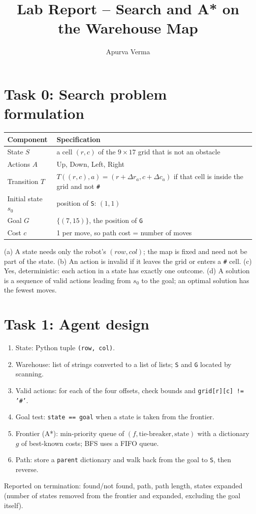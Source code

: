 \documentclass[10pt,a4paper]{article}
\title{Lab Report -- Search and A* on the Warehouse Map}
\author{Apurva Verma}\date{}
\begin{document}
\maketitle

\section*{Task 0: Search problem formulation}
\begin{center}\begin{tabular}{p{2.6cm}p{13cm}}\toprule
Component & Specification\\\midrule
State $S$ & a cell $(r,c)$ of the $9\times17$ grid that is not an obstacle\\
Actions $A$ & Up, Down, Left, Right\\
Transition $T$ & $T((r,c),a)=(r+\Delta r_a,c+\Delta c_a)$ if that cell is inside the grid and not \texttt{\#}\\
Initial state $s_0$ & position of \texttt{S}: $(1,1)$\\
Goal $G$ & $\{(7,15)\}$, the position of \texttt{G}\\
Cost $c$ & 1 per move, so path cost = number of moves\\\bottomrule\end{tabular}\end{center}
(a) A state needs only the robot's $(row,col)$; the map is fixed and need not be part of the state. (b) An action is invalid if it leaves the grid or enters a \texttt{\#} cell. (c) Yes, deterministic: each action in a state has exactly one outcome. (d) A solution is a sequence of valid actions leading from $s_0$ to the goal; an optimal solution has the fewest moves.

\section*{Task 1: Agent design}
\begin{enumerate}[leftmargin=*]
\item State: Python tuple \texttt{(row, col)}. \item Warehouse: list of strings converted to a list of lists; \texttt{S} and \texttt{G} located by scanning. \item Valid actions: for each of the four offsets, check bounds and \texttt{grid[r][c] != '\#'}. \item Goal test: \texttt{state == goal} when a state is taken from the frontier. \item Frontier (A*): min-priority queue of $(f,\text{tie-breaker},\text{state})$ with a dictionary $g$ of best-known costs; BFS uses a FIFO queue. \item Path: store a \texttt{parent} dictionary and walk back from the goal to \texttt{S}, then reverse.
\end{enumerate}
Reported on termination: found/not found, path, path length, states expanded (number of states removed from the frontier and expanded, excluding the goal itself).
\end{document}
